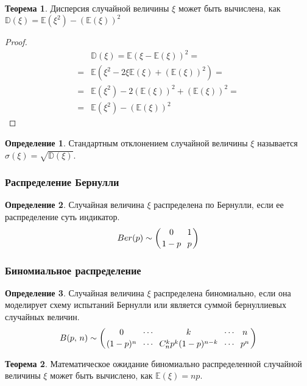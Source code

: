 \documentclass[12pt]{article}
\theoremstyle{definition}
\newtheorem{theorem}{Теорема}[section]
\newtheorem{definition}{Определение}
\newcommand{\E}{\mathbb{E}}
\newcommand{\D}{\mathbb{D}}
\begin{document}
\begin{theorem}
    Дисперсия случайной величины $\xi$ может быть вычислена, как $\D(\xi)=\E(\xi^2)-(\E(\xi))^2$
\end{theorem}

\begin{proof}
    \begin{align*}
        &\D(\xi)=\E(\xi-\E(\xi))^2=\\
        =&\E(\xi^2-2\xi\E(\xi)+(\E(\xi))^2)=\\
        =&\E(\xi^2)-2(\E(\xi))^2+(\E(\xi))^2=\\
        =&\E(\xi^2)-(\E(\xi))^2
    \end{align*}
\end{proof}

\begin{definition}
    Стандартным отклонением случайной величины $\xi$ называется $\sigma(\xi)=\sqrt{\D(\xi)}$.
\end{definition}

    \subsubsection{Распределение Бернулли}

\begin{definition}
    Случайная величина $\xi$  распределена по Бернулли, если ее распределение суть индикатор.
    $$Ber(p)\sim \left(\genfrac{}{}{0pt}{0}{0}{1-p} \,\,\, \genfrac{}{}{0pt}{0}{1}{p} \right)$$
\end{definition}

    \subsubsection{Биномиальное распределение}

\begin{definition}
    Случайная величина $\xi$ распределена биномиально, если она моделирует схему испытаний  Бернулли или является суммой бернуллиевых случайных величин.
    $$B(p,\,n)\sim \left( \genfrac{}{}{0pt}{0}{0}{(1-p)^n} \,\,\, \genfrac{}{}{0pt}{0}{\cdots}{\cdots} \,\,\, \genfrac{}{}{0pt}{0}{k}{C_n^kp^k(1-p)^{n-k}} \,\,\, \genfrac{}{}{0pt}{0}{\cdots}{\cdots} \,\,\, \genfrac{}{}{0pt}{0}{n}{p^n} \right)$$
\end{definition}

\begin{theorem}
    Математическое ожидание биномиально распределенной случайной величины $\xi$ может быть вычислено, как $\E(\xi)=np$.
\end{theorem}
\end{document}
